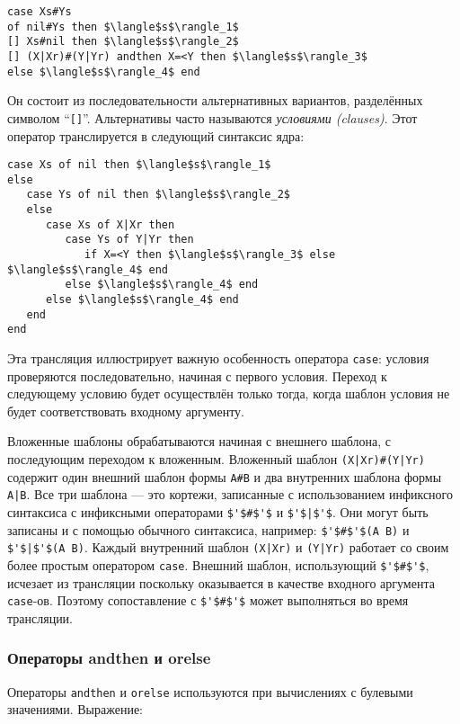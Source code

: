 \begin{lstlisting}
case Xs#Ys
of nil#Ys then $\langle$s$\rangle_1$
[] Xs#nil then $\langle$s$\rangle_2$
[] (X|Xr)#(Y|Yr) andthen X=<Y then $\langle$s$\rangle_3$
else $\langle$s$\rangle_4$ end
\end{lstlisting}

Он состоит из последовательности альтернативных вариантов, разделённых символом ``\lstinline|[]|''. Альтернативы часто называются \emph{условиями (clauses)}. Этот оператор транслируется в следующий синтаксис ядра:

\begin{lstlisting}
case Xs of nil then $\langle$s$\rangle_1$
else
   case Ys of nil then $\langle$s$\rangle_2$
   else
      case Xs of X|Xr then
         case Ys of Y|Yr then
            if X=<Y then $\langle$s$\rangle_3$ else $\langle$s$\rangle_4$ end
         else $\langle$s$\rangle_4$ end
      else $\langle$s$\rangle_4$ end
   end
end
\end{lstlisting}

Эта трансляция иллюстрирует важную особенность оператора \lstinline|case|: условия проверяются последовательно, начиная с первого условия. Переход к следующему условию будет осуществлён только тогда, когда шаблон условия не будет соответствовать входному аргументу.

Вложенные шаблоны обрабатываются начиная с внешнего шаблона, с последующим переходом к вложенным. Вложенный шаблон \lstinline!(X|Xr)#(Y|Yr)! содержит один внешний шаблон формы \lstinline!A#B! и два внутренних шаблона формы \lstinline!A|B!. Все три шаблона --- это кортежи, записанные с использованием инфиксного синтаксиса с инфиксными операторами \lstinline|$'$#$'$| и \lstinline!$'$|$'$!. Они могут быть записаны и с помощью обычного синтаксиса, например: \lstinline!$'$#$'$(A B)! и \lstinline!$'$|$'$(A B)!. Каждый внутренний шаблон  \lstinline!(X|Xr)! и \lstinline!(Y|Yr)! работает со своим более простым оператором \lstinline|case|. Внешний шаблон, использующий \lstinline|$'$#$'$|, исчезает из трансляции поскольку оказывается в качестве входного аргумента \lstinline|case|-ов. Поэтому сопоставление с \lstinline|$'$#$'$|  может выполняться во время трансляции.

\subsubsection{Операторы andthen и orelse}

Операторы \lstinline|andthen| и \lstinline|orelse| используются при вычислениях с булевыми значениями. Выражение:

